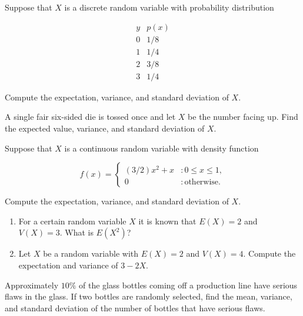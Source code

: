 \documentclass[12pt,reqno]{amsart}
\begin{document}
\newpage
\prob Suppose that $X$ is a discrete random variable with probability distribution

	\[
	\begin{array}{c|c}
	y & p(x) \\ \hline
	0 & 1/8   \\
	1 & 1/4   \\
	2 & 3/8  \\
	3 & 1/4 
	\end{array}
	\]

Compute the expectation, variance, and standard deviation of $X$.\vfill





















\bigskip
\prob A single fair six-sided die is tossed once and let $X$ be the number facing up. Find the expected value, variance, and standard deviation of $X$.\vfill





















\bigskip
\prob Suppose that $X$ is a continuous random variable with density function
	
	\[
	f(x) = \begin{cases}
	(3/2)x^2 + x & : 0\leq x \leq 1, \\
	0 & : \text{otherwise}.
	\end{cases}
	\]

Compute the expectation, variance, and standard deviation of $X$.\vfill














\newpage
\prob

\begin{enumerate}
\item For a certain random variable $X$ it is known that $E(X)=2$ and $V(X) = 3$. What is $E(X^2)$?\vfill
\item Let $X$ be a random variable with $E(X)=2$ and $V(X)=4$. Compute the expectation and variance of $3-2X$.\vfill
\end{enumerate}















\bigskip
\prob Approximately $10\%$ of the glass bottles coming off a production line have serious flaws in the glass. If two bottles are randomly selected, find the mean, variance, and standard deviation of the number of bottles that have serious flaws.\vfill
\end{document}
